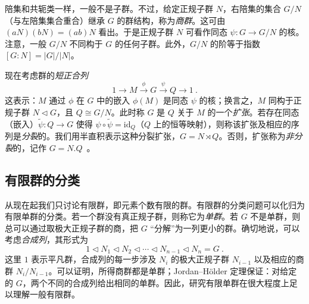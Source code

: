 
陪集和共轭类一样，一般不是子群。不过，给定正规子群 $N$，右陪集的集合 $G/N$（与左陪集集合重合）继承 $G$ 的群结构，称为\emph{商群}。这可由 $(aN)(bN) = (ab)N$ 看出。于是正规子群 $N$ 可看作同态 $\psi:G\rightarrow G/N$ 的核。注意，一般 $G/N$ 不同构于 $G$ 的任何子群。此外，$G/N$ 的阶等于指数 $[G:N]=|G|/|N|$。

现在考虑群的\emph{短正合列}
\begin{equation}
1\rightarrow M\xrightarrow{\phi} G\xrightarrow{\psi} Q\rightarrow1~. 
\end{equation}
这表示：$M$ 通过 $\phi$ 在 $G$ 中的嵌入 $\phi(M)$ 是同态 $\psi$ 的核；换言之，$M$ 同构于正规子群 $N\triangleleft G$，且 $Q\cong G/N$。此时称 $G$ 是 $Q$ 关于 $M$ 的一个\emph{扩张}。若存在同态（嵌入）$\widetilde{\psi}:Q\rightarrow G$ 使得 $\psi\circ \widetilde{\psi}=\text{id}_Q$（$Q$ 上的恒等映射），则称该扩张及相应的序列是\emph{分裂}的。我们用半直积表示这种分裂扩张，$G=N\rtimes Q$。否则，扩张称为\emph{非分裂}的，记作 $G=N.Q$~。


\subsection{有限群的分类}

从现在起我们只讨论有限群，即元素个数有限的群。有限群的分类问题可以化归为有限单群的分类。若一个群没有真正规子群，则称它为\emph{单群}。若 $G$ 不是单群，则总可以通过取极大正规子群的商，把 $G$ “分解”为一列更小的群。确切地说，可以考虑\emph{合成列}，其形式为
\begin{equation}
1\triangleleft N_1\triangleleft N_2\triangleleft\cdots \triangleleft N_{n-1}\triangleleft N_n=G~.
\end{equation}
这里 $1$ 表示平凡群，合成列的每一步涉及 $N_i$ 的极大正规子群 $N_{i-1}$ 以及相应的商群 $N_i/N_{i-1}$。可以证明，所得商群都是单群；Jordan--H{\"o}lder 定理保证：对给定的 $G$，两个不同的合成列给出相同的单群。因此，研究有限单群在很大程度上足以理解一般有限群。

